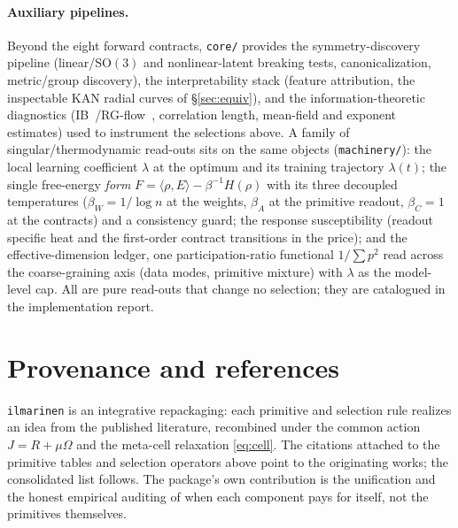 \documentclass[11pt]{article}
\newcommand{\allowbreakhere}{\discretionary{}{}{}}
\newcommand{\code}[1]{\texttt{\def\_{\char`_\allowbreakhere}#1}}
\newcommand{\SO}{\mathrm{SO}(3)}
\begin{document}
\paragraph{Auxiliary pipelines.} Beyond the eight forward contracts, \code{core/} provides the
symmetry-discovery pipeline (linear/$\SO$ and nonlinear-latent breaking tests, canonicalization,
metric/group discovery), the interpretability stack (feature attribution, the inspectable KAN radial curves
of \S\ref{sec:equiv}), and the information-theoretic diagnostics (IB~\cite{tishby2015ib}/RG-flow~\cite{mehta2014rg}, correlation length, mean-field
and exponent estimates) used to instrument the selections above. A family of singular/thermodynamic
read-outs sits on the same objects (\code{machinery/}): the local learning coefficient $\lambda$ at the
optimum and its training trajectory $\lambda(t)$; the single free-energy \emph{form}
$F=\langle\rho,E\rangle-\beta^{-1}H(\rho)$ with its three decoupled temperatures ($\beta_W=1/\log n$ at the
weights, $\beta_A$ at the primitive readout, $\beta_C=1$ at the contracts) and a consistency guard; the
response susceptibility (readout specific heat and the first-order contract transitions in the price); and
the effective-dimension ledger, one participation-ratio functional $1/\sum p^2$ read across the
coarse-graining axis (data modes, primitive mixture) with $\lambda$ as the model-level cap. All are pure
read-outs that change no selection; they are catalogued in the implementation report.


\section*{Provenance and references}
\code{ilmarinen} is an integrative repackaging: each primitive and selection rule realizes an idea from the
published literature, recombined under the common action $J=R+\mu\Omega$ and the meta-cell relaxation
\eqref{eq:cell}. The citations attached to the primitive tables and selection operators above point to the
originating works; the consolidated list follows. The package's own contribution is the unification and the
honest empirical auditing of when each component pays for itself, not the primitives themselves.



\end{document}
